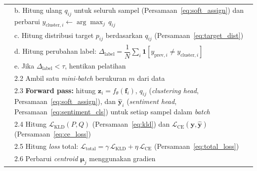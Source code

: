 \begin{table}[H]
\begin{tabular}{p{} p{}}
   & \hspace{2em} b. \hspace{0.5em}
     Hitung ulang $q_{ij}$ untuk seluruh sampel
     (Persamaan~\ref{eq:soft_assign}) dan perbarui
     $y_{\text{cluster},i} \leftarrow \arg\max_j\, q_{ij}$ \\[3pt]
   & \hspace{2em} c. \hspace{0.5em}
     Hitung distribusi target $p_{ij}$ berdasarkan $q_{ij}$
     (Persamaan~\ref{eq:target_dist}) \\[3pt]
   & \hspace{2em} d. \hspace{0.5em}
     Hitung perubahan label:
     $\Delta_{\text{label}} = \dfrac{1}{N}\displaystyle\sum_i
     \mathbf{1}[y_{\text{prev},i} \neq y_{\text{cluster},i}]$ \\[8pt]
   & \hspace{2em} e. \hspace{0.5em}
     Jika $\Delta_{\text{label}} < \tau$, hentikan pelatihan \\[3pt]
   & \hspace{1em} 2.2 \hspace{0.5em}
     Ambil satu \textit{mini-batch} berukuran $m$ dari data \\[3pt]
   & \hspace{1em} 2.3 \hspace{0.5em}
     \textbf{Forward pass:} hitung $\mathbf{z}_i = f_\theta(\mathbf{f}_i)$,
     $q_{ij}$ (\textit{clustering head}, Persamaan~\ref{eq:soft_assign}),
     dan $\hat{\mathbf{y}}_i$ (\textit{sentiment head},
     Persamaan~\ref{eq:sentiment_cls}) untuk setiap sampel dalam
     \textit{batch} \\[3pt]
   & \hspace{1em} 2.4 \hspace{0.5em}
     Hitung $\mathcal{L}_{\text{KLD}}(P, Q)$
     (Persamaan~\ref{eq:kld}) dan $\mathcal{L}_{\text{CE}}(\mathbf{y}, \hat{\mathbf{y}})$
     (Persamaan~\ref{eq:ce_loss}) \\[3pt]
   & \hspace{1em} 2.5 \hspace{0.5em}
     Hitung \textit{loss} total:
     $\mathcal{L}_{\text{total}} = \gamma \, \mathcal{L}_{\text{KLD}} +
     \eta \, \mathcal{L}_{\text{CE}}$ (Persamaan~\ref{eq:total_loss}) \\[3pt]
   & \hspace{1em} 2.6 \hspace{0.5em}
     Perbarui \textit{centroid} $\boldsymbol{\mu}_j$ menggunakan gradien

\end{tabular}
\end{table}
